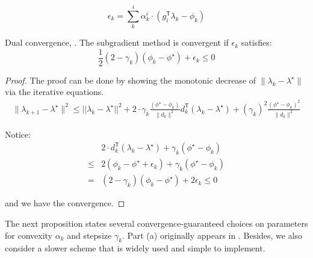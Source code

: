 \begin{equation}\label{eq:def_eps_simple}
  \epsilon_k = \sum^i_k \alpha^i_k \cdot \left ( g_i^\mathsf{T}\lambda_k  - \phi_k \right )
\end{equation}

\begin{lemma} \label{lemma:dual_conv} Dual convergence, \cite{brannlund1995generalized}. The
  subgradient method is convergent if \(\epsilon_k\) satisfies:
  \begin{equation}
    \frac{1}{2}(2 - \gamma_k) (\phi_{k} - \phi^\star)  + \epsilon_k \le 0
  \end{equation}
\end{lemma}
\begin{proof}
  The proof can be done by showing the monotonic decrease of
  \(\|\lambda_{k} - \lambda^\star\|\) via the iterative equations.
  \begin{equation}\begin{aligned}
      \|\lambda_{k+1} - \lambda^\star\|^2 \le ||\lambda_k - \lambda^\star||^2
      + 2\cdot \gamma_k \frac{(\phi^\star - \phi_{k})}{\|d_{k}\|^{2}} d_k^\mathsf{T}(\lambda_k - \lambda^\star)
      + (\gamma_{k})^{2} \frac{(\phi^\star - \phi_{k})^{2}}{\|d_{k}\|^{2}}
    \end{aligned}\end{equation}

  Notice: \begin{equation}\begin{aligned}
          & 2  \cdot d_k^\mathsf{T}(\lambda_k - \lambda^\star) + \gamma_{k}(\phi^\star - \phi_{k}) \\
      \le & 2 (\phi_{k} - \phi^\star + \epsilon_k) + \gamma_k(\phi^\star -\phi_k)                  \\
      =   & (2 - \gamma_k) (\phi_{k} - \phi^\star)  + 2\epsilon_k \le 0
    \end{aligned}\end{equation}

  and we have the convergence.
\end{proof}

The next proposition states several convergence-guaranteed choices on
parameters for convexity \(\alpha_k\) and stepsize \(\gamma_k\). Part
(a) originally appears in \cite{brannlund1995generalized}. Besides, we
also consider a slower scheme that is widely used and simple to
implement.

